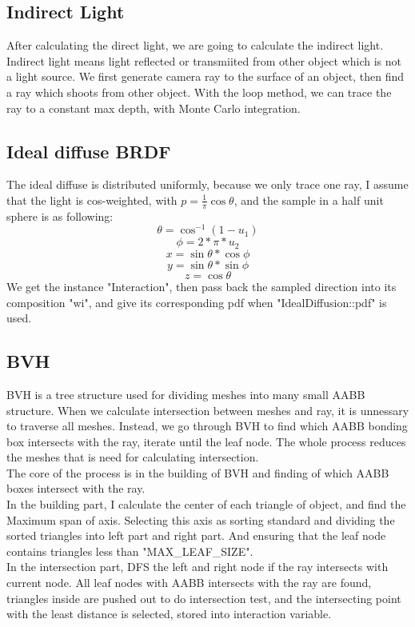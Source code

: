 \documentclass[acmtog]{acmart}
\begin{document}
\subsection{Indirect Light}
After calculating the direct light, we are going to calculate the indirect light. Indirect light means light reflected or transmiited from other object which is not a light source. We first generate camera ray to the surface of an object, then find a ray which shoots from other object. With the loop method, we can trace the ray to a constant max depth, with Monte Carlo integration.
\subsection{Ideal diffuse BRDF}
The ideal diffuse is distributed uniformly, because we only trace one ray, I assume that the light is cos-weighted, with $p=\frac{1}{\pi}\cos{\theta}$, and the sample in a half unit sphere is as following:
$$\theta = \cos^{-1}(1-u_1)$$
$$\phi = 2 * \pi * u_2$$
$$x = \sin{\theta} * \cos{\phi}$$
$$y =\sin{\theta} * \sin{\phi}$$
$$z =\cos{\theta}$$
We get the instance "Interaction", then pass back the sampled direction into its composition "wi", and give its corresponding pdf when "IdealDiffusion::pdf" is used.
\subsection{BVH}
BVH is a tree structure used for dividing meshes into many small AABB structure. When we calculate intersection between meshes and ray, it is unnessary to traverse all meshes. Instead, we go through BVH to find which AABB bonding box intersects with the ray, iterate until the leaf node. The whole process reduces the meshes that is need for calculating intersection.\\
The core of the process is in the building of BVH and finding of which AABB boxes intersect with the ray. \\
In the building part, I calculate the center of each triangle of object, and find the Maximum span of axis. Selecting this axis as sorting standard and dividing the sorted triangles into left part and right part. And ensuring that the leaf node contains triangles less than "MAX\_LEAF\_SIZE".\\
In the intersection part, DFS the left and right node if the ray intersects with current node. All leaf nodes with AABB intersects with the ray are found, triangles inside are pushed out to do intersection test, and the intersecting point with the least distance is selected, stored into interaction variable.
\end{document}
